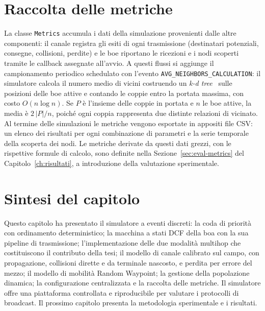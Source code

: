 \section{Raccolta delle metriche}
\label{sec:metrics}
La classe \texttt{Metrics} accumula i dati della simulazione provenienti dalle altre componenti: 
il canale registra gli esiti di ogni trasmissione (destinatari potenziali, consegne, collisioni, perdite) e le boe riportano le ricezioni e
i nodi scoperti tramite le callback assegnate all'avvio. A questi flussi si aggiunge il
campionamento periodico schedulato con l'evento \texttt{AVG\_NEIGHBORS\_CALCULATION}: il simulatore calcola il
numero medio di vicini costruendo un \emph{k-d tree}~\cite{kdtree} sulle posizioni delle boe
attive e contando le coppie entro la portata massima, con costo $O(n \log n)$. 
Se $P$ \`e l'insieme delle coppie in portata e $n$ le boe attive, la media \`e
$2\,|P| / n$, poich\'e ogni coppia rappresenta due distinte relazioni di vicinato.
Al termine delle simulazioni le metriche vengono esportate in appositi file CSV:
un elenco dei risultati per ogni combinazione di parametri e la serie temporale della scoperta dei nodi.
Le metriche derivate da questi dati grezzi, con le rispettive formule di
calcolo, sono definite nella Sezione~\ref{sec:eval-metrics} del
Capitolo~\ref{ch:risultati}, a introduzione della valutazione sperimentale.

\section*{Sintesi del capitolo}
Questo capitolo ha presentato il simulatore a eventi discreti: la coda di priorit\`a
con ordinamento deterministico; la macchina a stati DCF della boa con la sua pipeline
di trasmissione; l'implementazione delle due modalit\`a multihop che
costituiscono il contributo della tesi; il modello di canale calibrato
sul campo, con propagazione, collisioni dirette e da terminale nascosto, e perdita per errore del mezzo; 
il modello di mobilit\`a Random Waypoint; la gestione della popolazione
dinamica; la configurazione centralizzata e la raccolta delle metriche.
Il simulatore offre una piattaforma controllata e riproducibile per valutare i
protocolli di broadcast. Il prossimo capitolo presenta la metodologia sperimentale e i
risultati.
